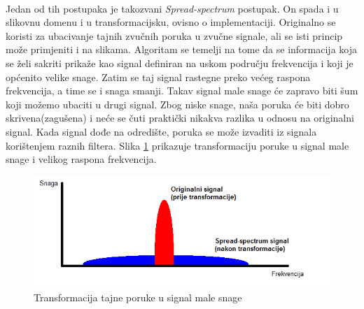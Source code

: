\documentclass[times, utf8, seminar]{fer}
\begin{document}
\paragraph{}
Jedan od tih postupaka je takozvani \textit{Spread-spectrum} postupak. On spada i u slikovnu domenu i u transformacijsku, ovisno o implementaciji. Originalno se koristi za ubacivanje tajnih zvučnih poruka u zvučne signale, ali se isti princip može primjeniti i na slikama. Algoritam se temelji na tome da se informacija koja se želi sakriti prikaže kao signal definiran na uskom području frekvencija i koji je općenito velike snage. Zatim se taj signal rastegne preko većeg raspona frekvencija, a time se i snaga smanji. Takav signal male snage će zapravo biti šum koji možemo ubaciti u drugi signal. Zbog niske snage, naša poruka će biti dobro skrivena(zagušena) i neće se čuti praktički nikakva razlika u odnosu na originalni signal. Kada signal dođe na odredište, poruka se može izvaditi iz signala korištenjem raznih filtera.  Slika \ref{transfrom} prikazuje transformaciju poruke u signal male snage i velikog raspona frekvencija.
\begin{figure}
\caption{Transformacija tajne poruke u signal male snage}
\label{transfrom}
\centerline{\includegraphics[scale=0.8]{images/transformation.png}}
\end{figure}
\end{document}
